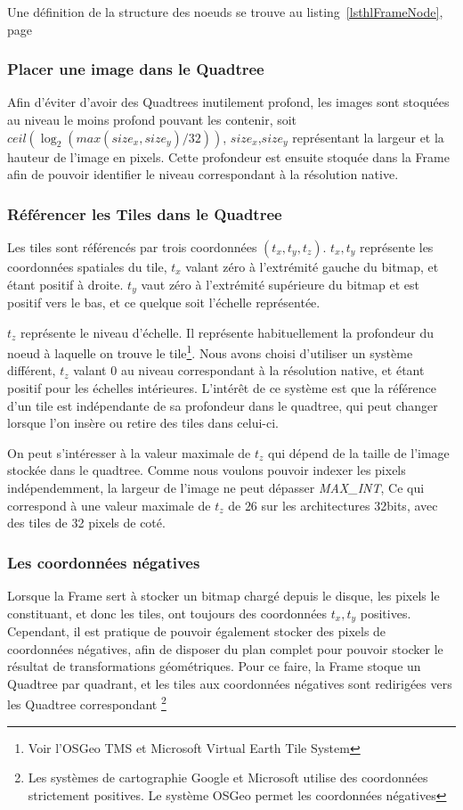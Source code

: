 				Une définition de la structure des noeuds se trouve au listing~\ref{lsthlFrameNode}, page~\pageref{lsthlFrameNode}

			\subsubsection{Placer une image dans le Quadtree}
				Afin d'éviter d'avoir des Quadtrees inutilement profond, les images sont stoquées au niveau le moins profond pouvant les contenir,
				soit \linebreak $ceil( \log_2( max(size_x,size_y)/32))$, $size_x$,$size_y$ représentant la largeur et la hauteur de l'image en pixels.
				Cette profondeur est ensuite stoquée dans la Frame afin de pouvoir identifier le niveau correspondant à la résolution native.

			\subsubsection{Référencer les Tiles dans le Quadtree}
				Les tiles sont référencés par trois coordonnées $(t_x,t_y,t_z)$. $t_x,t_y$ représente les coordonnées spatiales du tile, $t_x$ valant
				zéro à l'extrémité gauche du bitmap, et étant positif à droite. $t_y$ vaut zéro à l'extrémité supérieure du bitmap et est positif vers le bas,
				et ce quelque soit l'échelle représentée.
				
				$t_z$ représente le niveau d'échelle. Il représente habituellement la profondeur du noeud à laquelle on trouve le tile\footnote{Voir l'OSGeo TMS et Microsoft Virtual Earth Tile System}. Nous avons
				choisi d'utiliser un système différent, $t_z$ valant $0$ au niveau correspondant à la résolution native, et étant positif
				pour les échelles intérieures. L'intérêt de ce système est que la référence d'un tile est indépendante de sa profondeur dans
				le quadtree, qui peut changer lorsque l'on insère ou retire des tiles dans celui-ci.
				
				On peut s'intéresser à la valeur maximale de $t_z$ qui dépend de la taille de l'image stockée dans le quadtree.
				Comme nous voulons pouvoir indexer les pixels indépendemment, la largeur de l'image ne peut dépasser
				\emph{MAX\_INT}, Ce qui correspond à une valeur maximale de $t_z$ de $26$ sur les architectures 32bits, avec des tiles de 32 pixels
				de coté.
				
			\subsubsection{Les coordonnées négatives}
				Lorsque la Frame sert à stocker un bitmap chargé depuis le disque, les pixels le constituant, et donc les tiles, ont toujours des
				coordonnées $t_x,t_y$ positives. Cependant, il est pratique de pouvoir également stocker des pixels de coordonnées négatives, afin
				de disposer du plan complet pour pouvoir stocker le résultat de transformations géométriques. Pour ce faire, la Frame
				stoque un Quadtree par quadrant, et les tiles aux coordonnées négatives sont redirigées vers les Quadtree correspondant
				\footnote{Les systèmes de cartographie Google et Microsoft utilise des coordonnées strictement positives. 
				Le système OSGeo permet les coordonnées négatives}

